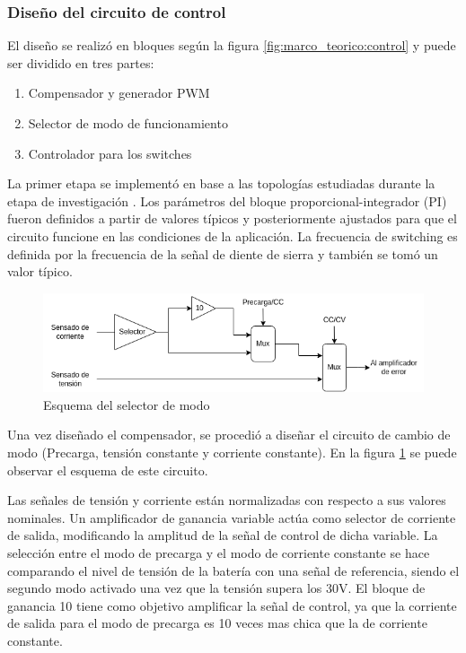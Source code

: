 
\subsubsection{Diseño del circuito de control}
El diseño se realizó en bloques según la figura \ref{fig:marco_teorico:control} y puede ser dividido en tres partes:

\begin{enumerate}
    \item Compensador y generador PWM
    \item Selector de modo de funcionamiento
    \item Controlador para los switches
\end{enumerate}

La primer etapa se implementó en base a las topologías estudiadas durante la etapa de investigación \cite{mohan}.
Los parámetros del bloque proporcional-integrador (PI) fueron definidos a partir de valores típicos
y posteriormente ajustados para que el circuito funcione en las condiciones de la aplicación.
La frecuencia de switching es definida por la frecuencia de la señal de diente de sierra y también se tomó un valor típico.

\begin{figure}
    \centering
    \includegraphics[width=\textwidth]{images/selector.png}
    \caption{Esquema del selector de modo}
    \label{fig:esquema_selector}
\end{figure}

Una vez diseñado el compensador, se procedió a diseñar el circuito de cambio de modo (Precarga, tensión constante y corriente constante).
En la figura \ref{fig:esquema_selector} se puede observar el esquema de este circuito.

Las señales de tensión y corriente están normalizadas con respecto a sus valores nominales.
Un amplificador de ganancia variable actúa como selector de corriente de salida,
modificando la amplitud de la señal de control de dicha variable.
La selección entre el modo de precarga y el modo de corriente constante se hace comparando el nivel de tensión de la batería
con una señal de referencia, siendo el segundo modo activado una vez que la tensión supera los 30V.
El bloque de ganancia 10 tiene como objetivo amplificar la señal de control, ya que la corriente de salida para el modo
de precarga es 10 veces mas chica que la de corriente constante.

